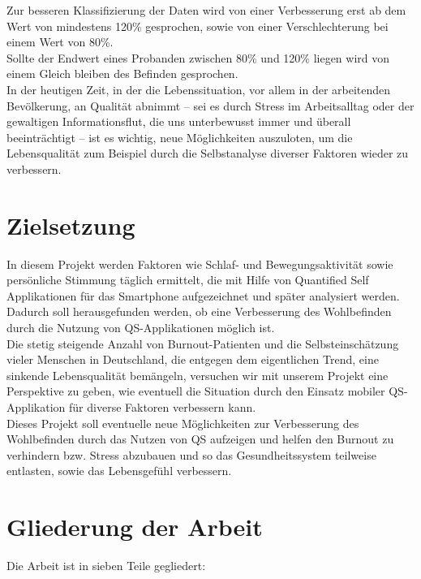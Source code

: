 Zur besseren Klassifizierung der Daten wird von einer Verbesserung erst ab dem Wert von mindestens 120\% gesprochen, sowie von einer Verschlechterung bei einem Wert von 80\%. \\Sollte der Endwert eines Probanden zwischen 80\% und 120\% liegen wird von einem Gleich bleiben des Befinden gesprochen.\\ 
In der heutigen Zeit, in der die Lebenssituation, vor allem in der arbeitenden Bevölkerung, an Qualität abnimmt – sei es durch Stress im Arbeitsalltag oder der gewaltigen Informationsflut, die uns unterbewusst immer und überall beeinträchtigt – ist es wichtig, neue Möglichkeiten auszuloten, um die Lebensqualität zum Beispiel durch die Selbstanalyse diverser Faktoren wieder zu verbessern. 

\section{Zielsetzung}
\label{ch:Einleitung:sec:Zielsetzung}

In diesem Projekt werden Faktoren wie Schlaf- und Bewegungsaktivität sowie persönliche Stimmung täglich ermittelt, die mit Hilfe von Quantified Self Applikationen für das Smartphone aufgezeichnet und später analysiert werden. 
Dadurch soll herausgefunden werden, ob eine Verbesserung des Wohlbefinden durch die Nutzung von QS-Applikationen möglich ist. \\
Die stetig steigende Anzahl von Burnout-Patienten und die Selbsteinschätzung vieler Menschen in Deutschland, die entgegen dem eigentlichen Trend, eine sinkende Lebensqualität bemängeln, versuchen wir mit unserem Projekt eine Perspektive zu geben, wie eventuell die Situation durch den Einsatz mobiler QS-Applikation für diverse Faktoren verbessern kann. \\
Dieses Projekt soll eventuelle neue Möglichkeiten zur Verbesserung des Wohlbefinden durch das Nutzen von QS aufzeigen und helfen den Burnout zu verhindern bzw. Stress abzubauen und so das Gesundheitssystem teilweise entlasten, sowie das Lebensgefühl verbessern. 

\section{Gliederung der Arbeit}
\label{ch:Einleitung:sec:GliederungDerArbeit}

Die Arbeit ist in sieben Teile gegliedert:

